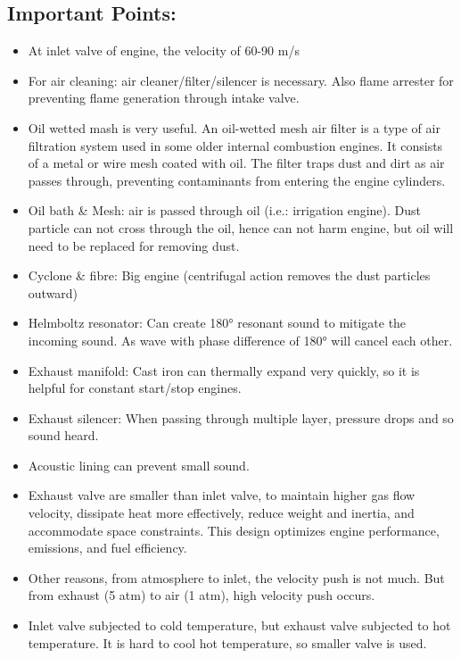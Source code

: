 \documentclass{article}
\begin{document}
\begin{multicols}{2}
  \subsection*{Important Points:}
  \begin{itemize}
    \item At inlet valve of engine, the velocity of 60-90 m/s 
    \item For air cleaning: air cleaner/filter/silencer is necessary. Also flame arrester for preventing flame generation through intake valve. 
    \item Oil wetted mash is very useful. An oil-wetted mesh air filter is a type of air filtration system used in some older internal combustion engines. It consists of a metal or wire mesh coated with oil. The filter traps dust and dirt as air passes through, preventing contaminants from entering the engine cylinders. 
    \item Oil bath \& Mesh: air is passed through oil (i.e.: irrigation engine). Dust particle can not cross through the oil, hence can not harm engine, but oil will need to be replaced for removing dust.
    \item Cyclone \& fibre: Big engine (centrifugal action removes the dust particles outward)
    \item Helmboltz resonator: Can create 180° resonant sound to mitigate the incoming sound. As wave with phase difference of 180° will cancel each other. 
    \item Exhaust manifold: Cast iron can thermally expand very quickly, so it is helpful for constant start/stop engines.
    \item Exhaust silencer: When passing through multiple layer, pressure drops and so sound heard.
    \item Acoustic lining can prevent small sound.
    \item Exhaust valve are smaller than inlet valve, to maintain higher gas flow velocity, dissipate heat more effectively, reduce weight and inertia, and accommodate space constraints. This design optimizes engine performance, emissions, and fuel efficiency. 
    \item Other reasons, from atmosphere to inlet, the velocity push is not much. But from exhaust (5 atm) to air (1 atm), high velocity push occurs.
    \item Inlet valve subjected to cold temperature, but exhaust valve subjected to hot temperature. It is hard to cool hot temperature, so smaller valve is used. 

\end{itemize}
\end{multicols}
\end{document}
